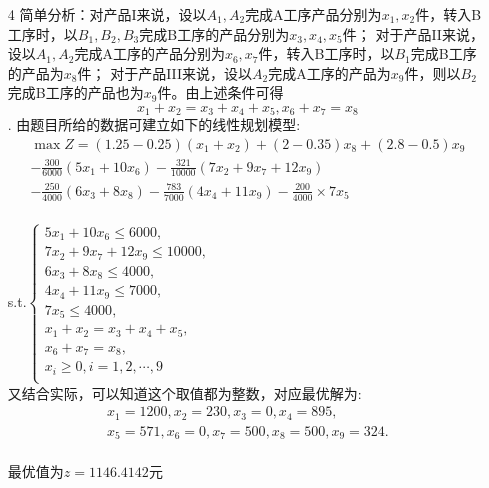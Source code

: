 \documentclass[a4paper,20pt]{article}
\begin{document}
\begin{itemize}
        \item[4] 简单分析：对产品I来说，设以$A_1,A_2$完成A工序产品分别为$x_1,x_2$件，转入B工序时，以$B_1,B_2,B_3$完成B工序的产品分别为$x_3,x_4,x_5$件；
        对于产品II来说，设以$A_1,A_2$完成A工序的产品分别为$x_6,x_7$件，转入B工序时，以$B_1$完成B工序的产品为$x_8$件；
        对于产品III来说，设以$A_2$完成A工序的产品为$x_9$件，则以$B_2$完成B工序的产品也为$x_9$件。由上述条件可得$$x_1+x_2=x_3+x_4+x_5,x_6+x_7=x_8$$.
        由题目所给的数据可建立如下的线性规划模型:
        \begin{align*}
            \max Z = (1.25-0.25)(x_1+x_2)+(2-0.35)x_8+(2.8-0.5)x_9
                   \\- \frac{300}{6000}(5x_1+10x_6)-\frac{321}{10000}(7x_2+9x_7+12x_9)
                   \\- \frac{250}{4000}(6x_3+8x_8) -\frac{783}{7000}(4x_4+11x_9)-\frac{200}{4000}\times 7x_5    
        \end{align*}
        \\s.t.$\left\{\begin{matrix}
            5x_1+10x_6\leq 6000,\\
            7x_2+9x_7+12x_9\leq 10000,\\
            6x_3+8x_8\leq 4000,\\
            4x_4+11x_9\leq 7000,\\
            7x_5\leq 4000,\\
            x_1+x_2=x_3+x_4+x_5,\\
            x_6+x_7=x_8,\\
            x_i\geq 0,i=1,2,\cdots,9\\
        \end{matrix}\right.$
        \\又结合实际，可以知道这个取值都为整数，对应最优解为:
        \begin{align*}
            x_1=1200,x_2=230,x_3=0,x_4=895,\\
            x_5=571,x_6=0,x_7=500,x_8=500,x_9=324.
        \end{align*}
        \\最优值为$z=1146.4142$元
        

\end{itemize}
\end{document}
